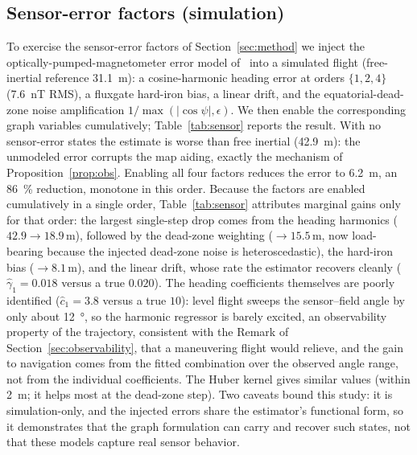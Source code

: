 \documentclass{IEEEtaes}
\begin{document}
\subsection{Sensor-error factors (simulation)}
To exercise the sensor-error factors of Section~\ref{sec:method} we inject the
optically-pumped-magnetometer error model of~\cite{hager2026b,wang2020} into a
simulated flight (free-inertial reference \SI{31.1}{\meter}): a cosine-harmonic
heading error at orders $\{1,2,4\}$ (\SI{7.6}{\nano\tesla} RMS), a fluxgate
hard-iron bias, a linear drift, and the equatorial-dead-zone noise amplification
$1/\max(|\cos\psi|,\epsilon)$. We then enable the corresponding graph variables
cumulatively; Table~\ref{tab:sensor} reports the result. With no sensor-error
states the estimate is worse than free inertial (\SI{42.9}{\meter}): the
unmodeled error corrupts the map aiding, exactly the mechanism of
Proposition~\ref{prop:obs}. Enabling all four factors reduces the error to
\SI{6.2}{\meter}, an \SI{86}{\percent} reduction, monotone in this order. Because
the factors are enabled cumulatively in a single order, Table~\ref{tab:sensor}
attributes marginal gains only for that order: the largest single-step drop comes
from the heading harmonics ($42.9\!\rightarrow\!18.9$\,m), followed by the
dead-zone weighting ($\rightarrow\!15.5$\,m, now load-bearing because the injected
dead-zone noise is heteroscedastic), the hard-iron bias
($\rightarrow\!8.1$\,m), and the linear drift, whose rate the estimator recovers
cleanly ($\hat{\gamma}_1\!=\!0.018$ versus a true $0.020$). The heading
coefficients themselves are poorly identified ($\hat{c}_1\!=\!3.8$ versus a true
$10$): level flight sweeps the sensor--field angle by only about
\SI{12}{\degree}, so the harmonic regressor is barely excited, an observability
property of the trajectory, consistent with the Remark of
Section~\ref{sec:observability}, that a maneuvering flight would relieve, and the
gain to navigation comes from the fitted combination over the observed angle
range, not from the individual coefficients. The Huber kernel gives similar values
(within \SI{2}{\meter}; it helps most at the dead-zone step). Two caveats bound
this study: it is simulation-only, and the injected errors share the estimator's
functional form, so it demonstrates that the graph formulation can carry and
recover such states, not that these models capture real sensor behavior.
\end{document}
